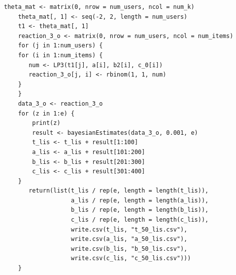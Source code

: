 \documentclass[12pt]{jarticle}
\numberwithin{equation}{subsection}
\begin{document}
\begin{lstlisting}[caption=ベイズ推定法,label=fuge]
    theta_mat <- matrix(0, nrow = num_users, ncol = num_k)
    theta_mat[, 1] <- seq(-2, 2, length = num_users)
    t1 <- theta_mat[, 1]
    reaction_3_o <- matrix(0, nrow = num_users, ncol = num_items)
    for (j in 1:num_users) {
    for (i in 1:num_items) {
       num <- LP3(t1[j], a[i], b2[i], c_0[i])
       reaction_3_o[j, i] <- rbinom(1, 1, num)
    }
    }
    data_3_o <- reaction_3_o
    for (z in 1:e) {
        print(z)
        result <- bayesianEstimates(data_3_o, 0.001, e)
        t_lis <- t_lis + result[1:100]
        a_lis <- a_lis + result[101:200]
        b_lis <- b_lis + result[201:300]
        c_lis <- c_lis + result[301:400]
    }
       return(list(t_lis / rep(e, length = length(t_lis)),
                   a_lis / rep(e, length = length(a_lis)),
                   b_lis / rep(e, length = length(b_lis)),
                   c_lis / rep(e, length = length(c_lis)),
                   write.csv(t_lis, "t_50_lis.csv"),
                   write.csv(a_lis, "a_50_lis.csv"),
                   write.csv(b_lis, "b_50_lis.csv"),
                   write.csv(c_lis, "c_50_lis.csv")))
    }
    \end{lstlisting}
\end{document}
